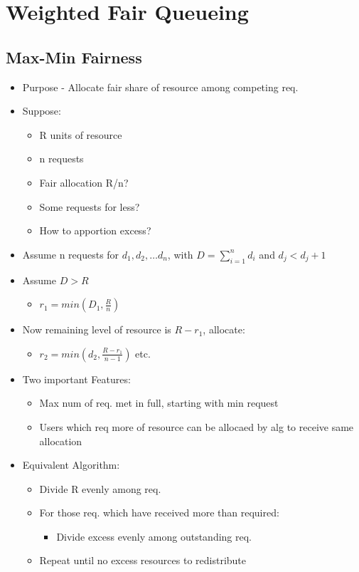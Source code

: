 \section{Weighted Fair Queueing}

\subsection{Max-Min Fairness}

\begin{itemize}
	\item Purpose - Allocate fair share of resource among competing req.
	\item Suppose:
	\begin{itemize}
		\item R units of resource
		\item n requests
		\item Fair allocation R/n?
		\item Some requests for less?
		\item How to apportion excess?
	\end{itemize}
	\item Assume n requests for $d_1, d_2, \ldots d_n$, with $D =
		\sum_{i=1}^{n} d_i$ and $d_j < d_j+1$
	\item Assume $D>R$
	 \begin{itemize}
		 \item $r_1 = min(D_1,\frac{R}{n})$
	\end{itemize}
	\item Now remaining level of resource is $R-r_1$, allocate:
	\begin{itemize}
		\item $r_2 = min(d_2, \frac{R-r_1}{n-1})$ etc.
	\end{itemize}
	\item Two important Features:
	\begin{itemize}
		\item Max num of req. met in full, starting with min request
		\item Users which req more of resource can be allocaed by alg to
			receive same allocation
	\end{itemize}
	\item Equivalent Algorithm:
	\begin{itemize}
		\item Divide R evenly among req.
		\item For those req. which have received more than required:
		\begin{itemize}
			\item Divide excess evenly among outstanding req.
		\end{itemize}
		\item Repeat until no excess resources to redistribute
	\end{itemize}
\end{itemize}

